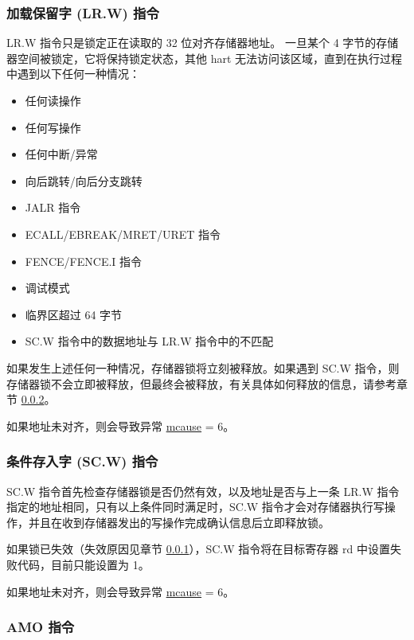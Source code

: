 \documentclass[main\_\_CN.tex]{subfiles}
\begin{document}
\subsubsection{加载保留字 (LR.W) 指令}
\label{sec:riscvcpu-atomic-lr}

LR.W 指令只是锁定正在读取的 32 位对齐存储器地址。 一旦某个 4 字节的存储器空间被锁定，它将保持锁定状态，其他 hart 无法访问该区域，直到在执行过程中遇到以下任何一种情况：

\begin{itemize}
    \item 任何读操作
    \item 任何写操作
    \item 任何中断/异常
    \item 向后跳转/向后分支跳转
    \item JALR 指令
    \item ECALL/EBREAK/MRET/URET 指令
    \item FENCE/FENCE.I 指令
    \item 调试模式
    \item 临界区超过 64 字节
    \item SC.W 指令中的数据地址与 LR.W 指令中的不匹配
\end{itemize}

如果发生上述任何一种情况，存储器锁将立刻被释放。如果遇到 SC.W 指令，则存储器锁不会立即被释放，但最终会被释放，有关具体如何释放的信息，请参考章节 \ref{sec:riscvcpu-atomic-sc}。

如果地址未对齐，则会导致异常 \hyperref[regdesc:MCAUSE]{mcause} = 6。

\subsubsection{条件存入字 (SC.W) 指令}
\label{sec:riscvcpu-atomic-sc}

SC.W 指令首先检查存储器锁是否仍然有效，以及地址是否与上一条 LR.W 指令指定的地址相同，只有以上条件同时满足时，SC.W 指令才会对存储器执行写操作，并且在收到存储器发出的写操作完成确认信息后立即释放锁。

如果锁已失效（失效原因见章节 \ref{sec:riscvcpu-atomic-lr}），SC.W 指令将在目标寄存器 rd 中设置失败代码，目前只能设置为 1。

如果地址未对齐，则会导致异常 \hyperref[regdesc:MCAUSE]{mcause} = 6。

\subsubsection{AMO 指令}
\label{sec:riscvcpu-atomic-amo}
\end{document}
